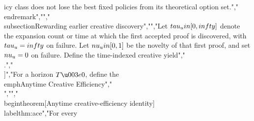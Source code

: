 {{{icy class does not lose the best fixed policies from its theoretical option set.","\\end{remark}","","\\subsection{Rewarding earlier creative discovery}","","Let $\\tau_u\\in[0,\\infty]$ denote the expansion count or time at which the first accepted proof is discovered, with $\\tau_u=\\infty$ on failure. Let $\\nu_u\\in[0,1]$ be the novelty of that first proof, and set $\\nu_u=0$ on failure. Define the time-indexed creative yield","\\[","\\cY_u(t)=\\E\\left[\\nu_u\\ind_{\\{\\tau_u\\le t\\}}\\right].","\\]","For a horizon $T\u003e0$, define the \\emph{Anytime Creative Efficiency}","\\[","\\operatorname{ACE}_T(u)","=\\frac{1}{T}\\int_0^T\\cY_u(t)\\,dt.","\\]","","\\begin{theorem}[Anytime creative-efficiency identity]\\label{thm:ace}","For every }}}
